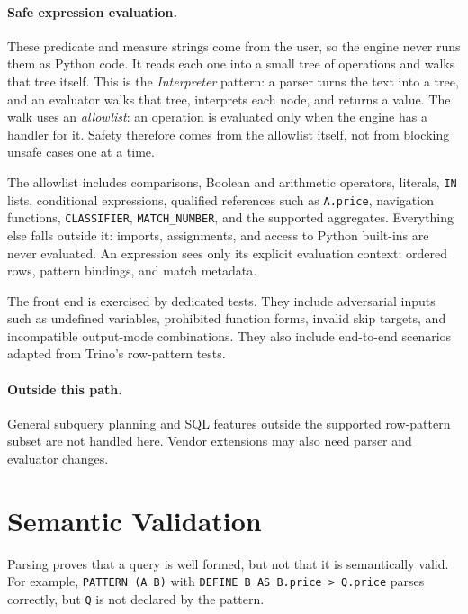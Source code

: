 \paragraph{Safe expression evaluation.}
These predicate and measure strings come from the user, so the engine
never runs them as Python code.  It reads each one into a small tree of operations and
walks that tree itself.  This is the \emph{Interpreter} pattern: a
parser turns the text into a tree, and an evaluator walks that tree,
interprets each node, and returns a value.  The walk uses an
\emph{allowlist}: an operation is evaluated only when the engine has a
handler for it.  Safety therefore comes from the allowlist itself, not
from blocking unsafe cases one at a time.

The allowlist includes comparisons, Boolean and arithmetic operators,
literals, \texttt{IN} lists, conditional expressions, qualified
references such as \texttt{A.price}, navigation functions,
\texttt{CLASSIFIER}, \texttt{MATCH\_NUMBER}, and the supported
aggregates.  Everything else falls outside it: imports, assignments,
and access to Python built-ins are never evaluated.  An expression sees
only its explicit evaluation context: ordered rows, pattern bindings,
and match metadata.

The front end is exercised by dedicated tests.  They include
adversarial inputs such as undefined variables, prohibited function
forms, invalid skip targets, and incompatible output-mode
combinations.  They also include end-to-end scenarios adapted from
Trino's row-pattern tests.

\paragraph{Outside this path.}
General subquery planning and SQL features outside the supported
row-pattern subset are not handled here.  Vendor extensions may also
need parser and evaluator changes.

\section{Semantic Validation}
\label{sec:meth-semantic}

Parsing proves that a query is well formed, but not that it is
semantically valid.  For example, \texttt{PATTERN (A B)} with
\texttt{DEFINE B AS B.price > Q.price} parses correctly, but
\texttt{Q} is not declared by the pattern.

